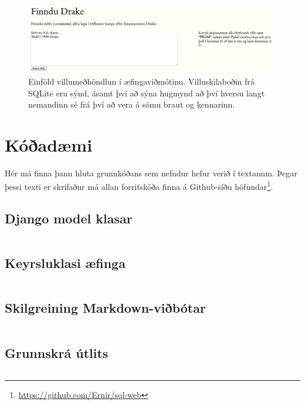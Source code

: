 \documentclass[a4paper,12pt,twoside,BCOR=10mm]{scrbook}
\begin{document}
\begin{figure}
\caption[Villumeðhöndlun]{Einföld villumeðhöndlun í æfingaviðmótinu. Villuskilaboðin frá SQLite eru sýnd, ásamt því að sýna hugmynd að því hversu langt nemandinn sé frá því að vera á sömu braut og kennarinn.}
\label{fig:example-error-handling}
\includegraphics[width=\textwidth]{mv-villuskilabod}
\end{figure}

\chapter{Kóðadæmi}
\label{sec:code-excerpts}
Hér má finna þann hluta grunnkóðans sem nefndur hefur verið í textanum. Þegar þessi texti er skrifaður má allan forritskóða finna á Github-síðu höfundar\footnote{\url{https://github.com/Ernir/sql-web}}.
\section{Django model klasar}
\label{code:django-model-objects}
\inputminted[fontsize=\scriptsize, frame=lines, linenos=true, python3=true, label=models.py]{python}{../sql\string_web/models.py}
\section{Keyrsluklasi æfinga}
\label{code:example-runner}
\inputminted[fontsize=\scriptsize, frame=lines, linenos=true, python3=true, label=sql_runner.py]{python}{../sql\string_web/sql\string_runner.py}
\section{Skilgreining Markdown-viðbótar}
\label{code:footnote-extension}
\inputminted[fontsize=\scriptsize, frame=lines, linenos=true, python3=true, label=footnotes.py]{python}{../sql\string_web/markdown\string_extensions/footnotes.py}
\section{Grunnskrá útlits}
\label{code:base-template}
\inputminted[fontsize=\scriptsize, frame=lines, linenos=true, label=base.html]{django}{../templates/base.html}
\end{document}
